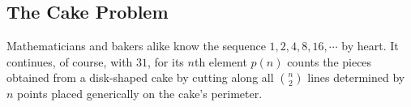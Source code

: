 \documentclass[twocolumn]{article}
\theoremstyle{definition}
\begin{document}

    \subsection*{The Cake Problem}

    Mathematicians and bakers alike know the sequence $1, 2, 4, 8, 16, \cdots$
    by heart.  It continues, of course, with $31$, for its $n$th element $p(n)$
    counts the pieces obtained from a disk-shaped cake by cutting along all
    ${n\choose 2}$ lines determined by $n$ points placed generically on the
    cake's perimeter.
\end{document}
